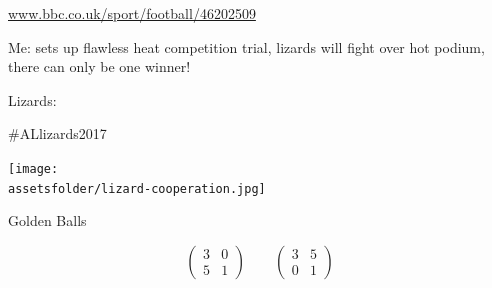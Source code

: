 \documentclass{beamer}
\newcommand{\assetsfolder}{./assets}
\begin{document}
    \begin{frame}
        \begin{center}
            \Large
            \url{www.bbc.co.uk/sport/football/46202509}
        \end{center}
    \end{frame}

    \begin{frame}
        \begin{center}
            \begin{tcolorbox}[colback=twitter,colframe=twitter!40!black,title=
                    \href{https://twitter.com/kirstyjean/status/870415613746962432}
                    {@kirstyjean} (2 Jun 2017):
]
                    Me: sets up flawless heat competition trial, lizards will
                    fight over hot podium, there can only be one winner!

                    Lizards:

                    \#ALlizards2017
           \end{tcolorbox}
        \end{center}
        \begin{center}
            \pause
            \texttt{[image: \\assetsfolder/lizard-cooperation.jpg]}
        \end{center}

    \end{frame}

    \begin{frame}
        \Huge
        Golden Balls
    \end{frame}

    \begin{frame}
        \Huge
        \[
            \begin{pmatrix}
                3 & 0\\
                5 & 1
            \end{pmatrix}
            \qquad
            \begin{pmatrix}
                3 & 5\\
                0 & 1
            \end{pmatrix}
        \]
    \end{frame}
\end{document}
